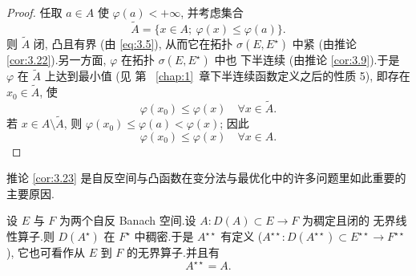 \begin{proof}
任取 $a\in A$ 使 $\varphi(a)<+\infty$, 并考虑集合
\begin{equation*}
\tilde{A}=\{x\in A;\ \varphi(x)\le\varphi(a)\}.
\end{equation*}
则 $\tilde{A}$ 闭, 凸且有界 (由 \eqref{eq:3.5}), 从而它在拓扑 $\sigma(E,E^\star)$
中紧 (由推论  \ref{cor:3.22}).另一方面, $\varphi$ 在拓扑 $\sigma(E,E^\star)$ 中也
下半连续 (由推论  \ref{cor:3.9}).于是 $\varphi$ 在 $\tilde{A}$ 上达到最小值 (见
第~
\ref{chap:1}~章下半连续函数定义之后的性质 5), 即存在 $x_0\in\tilde{A}$, 使
\begin{equation*}
\varphi(x_0)\le\varphi(x)\quad\forall x\in\tilde{A}.
\end{equation*}
若 $x\in A\setminus\tilde{A}$, 则 $\varphi(x_0)\le\varphi(a)<\varphi(x)$; 因此
\begin{equation*}
\varphi(x_0)\le\varphi(x)\quad\forall x\in A.
\end{equation*}
\end{proof}

\begin{remark}
\label{rem:3.18}
推论  \ref{cor:3.23} 是自反空间与凸函数在变分法与最优化中的许多问题里如此重要的
主要原因.
\end{remark}

\begin{theorem}
\label{thm:3.24}
设 $E$ 与 $F$ 为两个自反 Banach 空间.设 $A:D(A)\subset E\to F$ 为稠定且闭的
无界线性算子.则 $D(A^\star)$ 在 $F^\star$ 中稠密.于是 $A^{\star\star}$ 有定义
($A^{\star\star}:D(A^{\star\star})\subset E^{\star\star}\to F^{\star\star}$),
它也可看作从 $E$ 到 $F$ 的无界算子.并且有
\begin{equation*}
\boxed{A^{\star\star}=A.}
\end{equation*}
\end{theorem}


